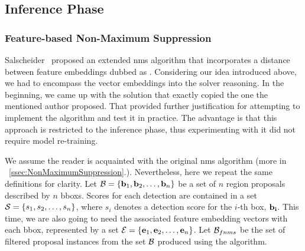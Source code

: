 \subsection{Inference Phase}

\subsubsection{Feature-based Non-Maximum Suppression}
\label{sssec:FeatureNonMaximumSuppression}

Salscheider~\cite{salscheider2020featurenms} proposed an extended \gls{nms} algorithm that incorporates a distance between feature embeddings dubbed as \featurenms{}. Considering our idea introduced above, we had to encompass the vector embeddings into the solver reasoning. In the beginning, we came up with the solution that exactly copied the one the mentioned author proposed. That provided further justification for attempting to implement the algorithm and test it in practice. The advantage is that this approach is restricted to the inference phase, thus experimenting with it did not require model re-training.

We assume the reader is acquainted with the original \gls{nms} algorithm (more in \sectiontext{}~\ref{ssec:NonMaximumSuppression}.). Nevertheless, here we repeat the same definitions for clarity. Let $\mathcal{B} = \left\{ {\mathbf{b}_1, \mathbf{b}_2, \dots, \mathbf{b}_n} \right\}$ be a set of $n$ region proposals described by $n$ \glspl{bbox}. Scores for each detection are contained in a set $\mathcal{S} = \left\{ {s_1, s_2, \dots, s_n} \right\}$, where $s_i$ denotes a detection score for the $i$-th box, $\mathbf{b_i}$. This time, we are also going to need the associated feature embedding vectors with each \gls{bbox}, represented by a set $\mathcal{E} = \left\{ {\mathbf{e}_1, \mathbf{e}_2, \dots, \mathbf{e}_n} \right\}$. Let $\mathcal{B}_{fnms}$ be  the set of filtered proposal instances from the set $\mathcal{B}$ produced using the \featurenms{} algorithm.

\def\threshlower{\tau_{\text{lower}}}
\def\threshupper{\tau_{\text{upper}}}
\def\threshsim{\delta}

